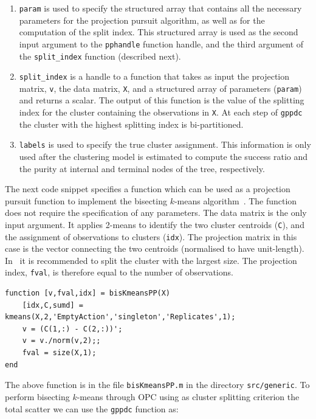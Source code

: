 \documentclass{book}
\begin{document}
\begin{enumerate}

\item {\tt param} is used to specify the structured array that contains
all the necessary parameters for the projection pursuit
algorithm, as well as for the computation of the split index.
%
This structured array is used as
the second input argument to the {\tt pphandle} function handle, and
the third argument of the {\tt split\_index} function (described next).

\item {\tt split\_index} is a handle to a function that takes
as input the projection matrix, {\tt v}, the data matrix, {\tt X}, and a
structured array of parameters ({\tt param}) and returns a scalar. The output
of this function is the value of the splitting index for the cluster containing
the observations in {\tt X}.
%
At each step of {\tt gppdc} the cluster with the highest splitting index is
bi-partitioned.

\item {\tt labels} is used to specify the true cluster assignment. This
information is only used after the clustering model is estimated to compute the
success ratio and the purity at internal and terminal nodes of the tree,
respectively.

\end{enumerate}

The next code snippet specifies a function which can be used as a projection
pursuit function to implement the bisecting $k$-means
algorithm~\cite{SteinbachKK2000}. The function does not require the specification 
of any parameters. The data matrix is the only input argument.
It applies 2-means to identify the two cluster centroids ({\tt C}),
and the assignment of observations to clusters ({\tt idx}).
The projection matrix in this case is the vector connecting the two centroids
(normalised to have unit-length). In~\cite{SteinbachKK2000} it is recommended to
split the cluster with the largest size. The projection index, {\tt fval},
is therefore equal to the number of observations.

\begin{verbatim}
function [v,fval,idx] = bisKmeansPP(X)
	[idx,C,sumd] = kmeans(X,2,'EmptyAction','singleton','Replicates',1);
	v = (C(1,:) - C(2,:))';
	v = v./norm(v,2);;
	fval = size(X,1);
end
\end{verbatim}

\noindent
%
The above function is in the file {\tt bisKmeansPP.m} in the directory {\tt src/generic}.
To perform bisecting $k$-means through OPC using as cluster splitting criterion 
the total scatter we can use the {\tt gppdc} function as:
\end{document}
